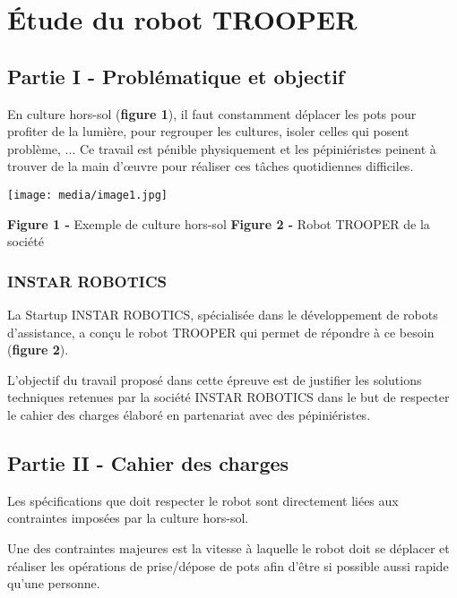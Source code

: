 \documentclass[
]{article}
\author{}
\date{}
\begin{document}
\hypertarget{uxe9tude-du-robot-trooper}{%
\section{Étude du robot TROOPER}\label{uxe9tude-du-robot-trooper}}

\hypertarget{partie-i---probluxe9matique-et-objectif}{%
\subsection{Partie I - Problématique et
objectif}\label{partie-i---probluxe9matique-et-objectif}}

En culture hors-sol (\textbf{figure 1}), il faut constamment déplacer
les pots pour profiter de la lumière, pour regrouper les cultures,
isoler celles qui posent problème, ... Ce travail est pénible
physiquement et les pépiniéristes peinent à trouver de la main d'œuvre
pour réaliser ces tâches quotidiennes difficiles.

\texttt{[image: media/image1.jpg]}

\textbf{Figure 1 -} Exemple de culture hors-sol \textbf{Figure 2 -}
Robot TROOPER de la société

\hypertarget{instar-robotics}{%
\subsubsection{INSTAR ROBOTICS}\label{instar-robotics}}

La Startup INSTAR ROBOTICS, spécialisée dans le développement de robots
d'assistance, a conçu le robot TROOPER qui permet de répondre à ce
besoin (\textbf{figure 2}).

L'objectif du travail proposé dans cette épreuve est de justifier les
solutions techniques retenues par la société INSTAR ROBOTICS dans le but
de respecter le cahier des charges élaboré en partenariat avec des
pépiniéristes.

\hypertarget{partie-ii---cahier-des-charges}{%
\subsection{Partie II - Cahier des
charges}\label{partie-ii---cahier-des-charges}}

Les spécifications que doit respecter le robot sont directement liées
aux contraintes imposées par la culture hors-sol.

Une des contraintes majeures est la vitesse à laquelle le robot doit se
déplacer et réaliser les opérations de prise/dépose de pots afin d'être
si possible aussi rapide qu'une personne.
\end{document}
